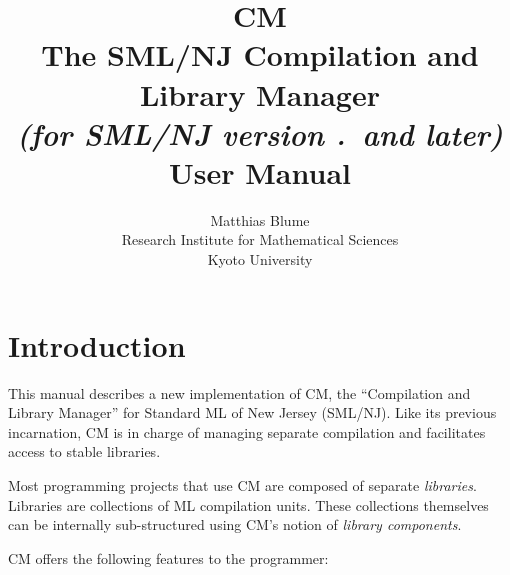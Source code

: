 \documentclass[titlepage,letterpaper]{article}
\author{Matthias Blume \\
Research Institute for Mathematical Sciences \\
Kyoto University}
\title{{\bf CM}\\
The SML/NJ Compilation and Library Manager \\
{\it\small (for SML/NJ version \smlmj.\smlmn~and later)} \\
User Manual}
\begin{document}


\maketitle

\pagebreak

\tableofcontents

\pagebreak

\section{Introduction}

This manual describes a new implementation of CM, the ``Compilation
and Library Manager'' for Standard ML of New Jersey (SML/NJ).  Like
its previous incarnation, CM is in charge of managing separate
compilation and facilitates access to stable libraries.

Most programming projects that use CM are composed of separate {\em
libraries}.  Libraries are collections of ML compilation units.  These
collections themselves can be internally sub-structured using CM's
notion of {\em library components}.

CM offers the following features to the programmer:
\end{document}
